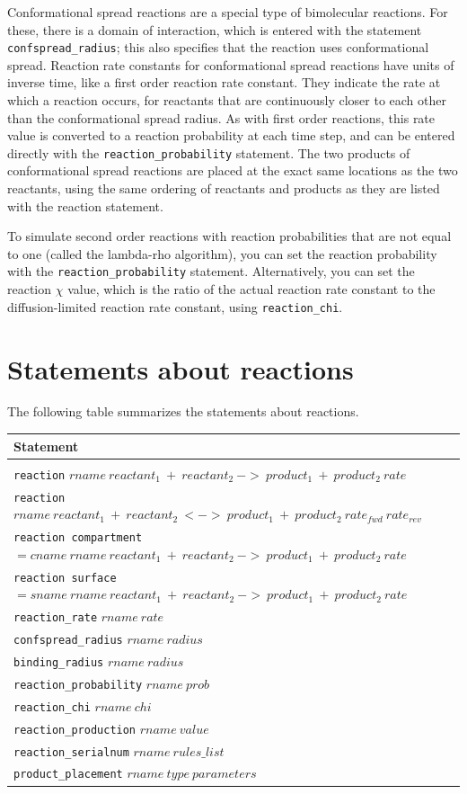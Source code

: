 \documentclass {scrbook}
\newcommand {\ttt} {\texttt}
\begin{document}
Conformational spread reactions are a special type of bimolecular reactions. For these, there is a domain of interaction, which is entered with the statement \ttt{confspread\_radius}; this also specifies that the reaction uses conformational spread. Reaction rate constants for conformational spread reactions have units of inverse time, like a first order reaction rate constant. They indicate the rate at which a reaction occurs, for reactants that are continuously closer to each other than the conformational spread radius. As with first order reactions, this rate value is converted to a reaction probability at each time step, and can be entered directly with the \ttt{reaction\_probability} statement. The two products of conformational spread reactions are placed at the exact same locations as the two reactants, using the same ordering of reactants and products as they are listed with the reaction statement.

To simulate second order reactions with reaction probabilities that are not equal to one (called the lambda-rho algorithm), you can set the reaction probability with the \ttt{reaction\_probability} statement. Alternatively, you can set the reaction $\chi$ value, which is the ratio of the actual reaction rate constant to the diffusion-limited reaction rate constant, using \ttt{reaction\_chi}.

\section{Statements about reactions}

The following table summarizes the statements about reactions.

\begin{longtable}[c]{l}
Statement\\
\hline\\
\ttt{reaction} $rname\ reactant_1\ +\ reactant_2\ ->\ product_1\ +\ product_2\ rate$\\
\ttt{reaction} $rname\ reactant_1\ +\ reactant_2\ <->\ product_1\ +\ product_2\ rate_{fwd}\ rate_{rev}$\\
\ttt{reaction compartment}$=cname\ rname\ reactant_1\ +\ reactant_2\ ->\ product_1\ +\ product_2\ rate$\\
\ttt{reaction surface}$=sname\ rname\ reactant_1\ +\ reactant_2\ ->\ product_1\ +\ product_2\ rate$\\
\ttt{reaction\_rate} $rname\ rate$\\
\ttt{confspread\_radius} $rname\ radius$\\
\ttt{binding\_radius} $rname\ radius$\\
\ttt{reaction\_probability} $rname\ prob$\\
\ttt{reaction\_chi} $rname\ chi$\\
\ttt{reaction\_production} $rname\ value$\\
\ttt{reaction\_serialnum} $rname\ rules\_list$\\
\ttt{product\_placement} $rname\ type\ parameters$
\end{longtable}
\end{document}
